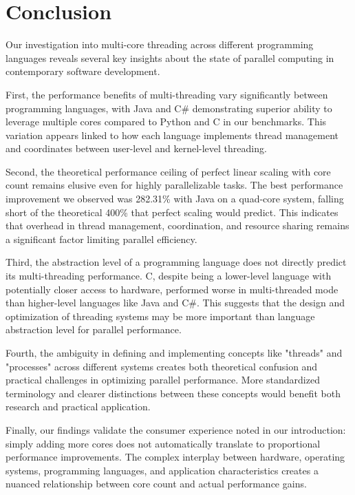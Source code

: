 \documentclass[12pt,a4paper]{article}
\begin{document}
\section{Conclusion}

Our investigation into multi-core threading across different programming languages reveals several key insights about the state of parallel computing in contemporary software development.

First, the performance benefits of multi-threading vary significantly between programming languages, with Java and C\# demonstrating superior ability to leverage multiple cores compared to Python and C in our benchmarks. This variation appears linked to how each language implements thread management and coordinates between user-level and kernel-level threading.

Second, the theoretical performance ceiling of perfect linear scaling with core count remains elusive even for highly parallelizable tasks. The best performance improvement we observed was 282.31\% with Java on a quad-core system, falling short of the theoretical 400\% that perfect scaling would predict. This indicates that overhead in thread management, coordination, and resource sharing remains a significant factor limiting parallel efficiency.

Third, the abstraction level of a programming language does not directly predict its multi-threading performance. C, despite being a lower-level language with potentially closer access to hardware, performed worse in multi-threaded mode than higher-level languages like Java and C\#. This suggests that the design and optimization of threading systems may be more important than language abstraction level for parallel performance.

Fourth, the ambiguity in defining and implementing concepts like "threads" and "processes" across different systems creates both theoretical confusion and practical challenges in optimizing parallel performance. More standardized terminology and clearer distinctions between these concepts would benefit both research and practical application.

Finally, our findings validate the consumer experience noted in our introduction: simply adding more cores does not automatically translate to proportional performance improvements. The complex interplay between hardware, operating systems, programming languages, and application characteristics creates a nuanced relationship between core count and actual performance gains.
\end{document}
